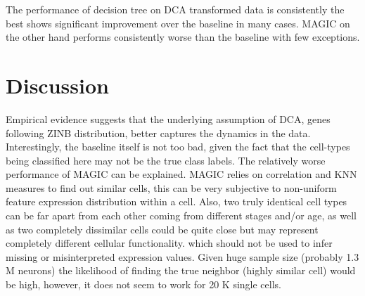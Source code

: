 The performance of decision tree on DCA transformed data is consistently the best shows significant improvement over the baseline in many cases. MAGIC on the other hand performs consistently worse than the baseline with few exceptions.

\section*{Discussion}

Empirical evidence suggests that the underlying assumption of DCA, genes following ZINB distribution, better captures the dynamics in the data. Interestingly, the baseline itself is not too bad, given the fact that the cell-types being classified here may not be the true class labels. The relatively worse performance of MAGIC can be explained. MAGIC relies on correlation and KNN measures to find out similar cells, this can be very subjective to non-uniform feature expression distribution within a cell. Also, two truly identical cell types can be far apart from each other coming from different stages and/or age, as well as two completely dissimilar cells could be quite close but may represent completely different cellular functionality. which should not be used to infer missing or misinterpreted expression values. Given huge sample size (probably 1.3 M neurons) the likelihood of finding the true neighbor (highly similar cell) would be high, however, it does not seem to work for 20 K single cells.